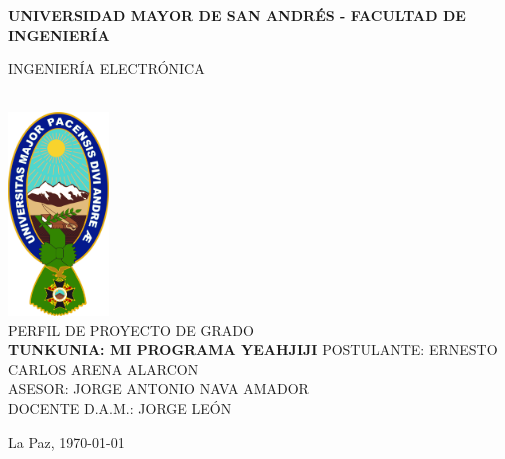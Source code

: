 \begin{titlepage}
    \centering
    {\bfseries \large 
    UNIVERSIDAD MAYOR DE SAN ANDRÉS - FACULTAD DE INGENIERÍA\par 
    INGENIERÍA 	ELECTRÓNICA
    }\\[2cm]
    
    \includegraphics[width=0.2\textwidth]{assets/umsa.png}\\[1cm]
    
    {\LARGE \MakeUppercase{Perfil de Proyecto de Grado}}\\[1cm]
    
    \textbf{\Large \MakeUppercase{TUNKUNIA: Mi programa yeahjiji}}
    \vfill
    \MakeUppercase{Postulante: }
    \MakeUppercase{Ernesto Carlos Arena Alarcon}\\[1cm]
    
    \MakeUppercase{Asesor: }
    \MakeUppercase{Jorge Antonio Nava Amador}\\[1cm]
    
    \MakeUppercase{Docente D.A.M.: }
    \MakeUppercase{Jorge León}\\[1cm]
    
    \vfill
    {La Paz, \today\par}
\end{titlepage}